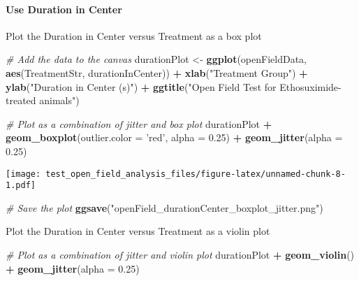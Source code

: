\documentclass[]{article}
\newenvironment{Shaded}{\begin{snugshade}}{\end{snugshade}}
\newcommand{\KeywordTok}[1]{\textcolor[rgb]{0.13,0.29,0.53}{\textbf{#1}}}
\newcommand{\DataTypeTok}[1]{\textcolor[rgb]{0.13,0.29,0.53}{#1}}
\newcommand{\FloatTok}[1]{\textcolor[rgb]{0.00,0.00,0.81}{#1}}
\newcommand{\StringTok}[1]{\textcolor[rgb]{0.31,0.60,0.02}{#1}}
\newcommand{\CommentTok}[1]{\textcolor[rgb]{0.56,0.35,0.01}{\textit{#1}}}
\newcommand{\OperatorTok}[1]{\textcolor[rgb]{0.81,0.36,0.00}{\textbf{#1}}}
\newcommand{\NormalTok}[1]{#1}
\let\oldparagraph\paragraph
\renewcommand{\paragraph}[1]{\oldparagraph{#1}\mbox{}}
\begin{document}
\paragraph{Use Duration in Center}\label{use-duration-in-center}

Plot the Duration in Center versus Treatment as a box plot

\begin{Shaded}
\begin{Highlighting}[]
\CommentTok{# Add the data to the canvas}
\NormalTok{durationPlot <-}\StringTok{ }\KeywordTok{ggplot}\NormalTok{(openFieldData, }\KeywordTok{aes}\NormalTok{(TreatmentStr, durationInCenter)) }\OperatorTok{+}
\StringTok{    }\KeywordTok{xlab}\NormalTok{(}\StringTok{"Treatment Group"}\NormalTok{) }\OperatorTok{+}\StringTok{ }\KeywordTok{ylab}\NormalTok{(}\StringTok{"Duration in Center (s)"}\NormalTok{) }\OperatorTok{+}
\StringTok{    }\KeywordTok{ggtitle}\NormalTok{(}\StringTok{"Open Field Test for Ethosuximide-treated animals"}\NormalTok{)}

\CommentTok{# Plot as a combination of jitter and box plot}
\NormalTok{durationPlot }\OperatorTok{+}\StringTok{ }\KeywordTok{geom_boxplot}\NormalTok{(}\DataTypeTok{outlier.color =} \StringTok{'red'}\NormalTok{, }\DataTypeTok{alpha =} \FloatTok{0.25}\NormalTok{) }\OperatorTok{+}
\StringTok{    }\KeywordTok{geom_jitter}\NormalTok{(}\DataTypeTok{alpha =} \FloatTok{0.25}\NormalTok{)}
\end{Highlighting}
\end{Shaded}

\texttt{[image: test\_open\_field\_analysis\_files/figure-latex/unnamed-chunk-8-1.pdf]}

\begin{Shaded}
\begin{Highlighting}[]
\CommentTok{# Save the plot}
\KeywordTok{ggsave}\NormalTok{(}\StringTok{"openField_durationCenter_boxplot_jitter.png"}\NormalTok{)}
\end{Highlighting}
\end{Shaded}

Plot the Duration in Center versus Treatment as a violin plot

\begin{Shaded}
\begin{Highlighting}[]
\CommentTok{# Plot as a combination of jitter and violin plot}
\NormalTok{durationPlot }\OperatorTok{+}\StringTok{ }\KeywordTok{geom_violin}\NormalTok{() }\OperatorTok{+}
\StringTok{    }\KeywordTok{geom_jitter}\NormalTok{(}\DataTypeTok{alpha =} \FloatTok{0.25}\NormalTok{)}
\end{Highlighting}
\end{Shaded}
\end{document}
